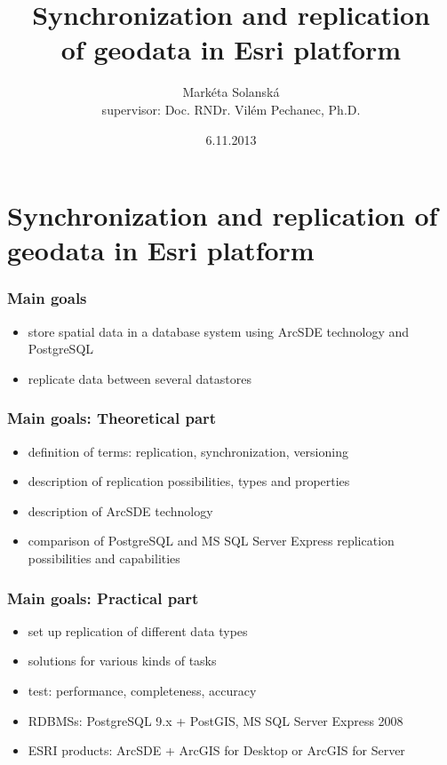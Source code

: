 \documentclass[xcolor=dvipsnames, 14pt]{beamer}
\begin{document}
\title[Synchronization and replication of geodata]{Synchronization and replication \\ of geodata in Esri platform}
\author[M. Solanská]{Markéta Solanská \\ supervisor: Doc. RNDr. Vilém Pechanec, Ph.D.}
\date[6.11.2013]{6.11.2013}





\begin{frame}
  \titlepage
\end{frame}



\section{Synchronization and replication of geodata in Esri platform}

  \begin{frame}
    \frametitle{Main goals}
    \begin{itemize}
      \item store spatial data in a database system using ArcSDE technology and PostgreSQL
      \item replicate data between several datastores
    \end{itemize}
  \end{frame}
  
  \begin{frame}
    \frametitle{Main goals: Theoretical part}
    \begin{itemize}
      \item definition of terms: replication, synchronization, versioning
      \item description of replication possibilities, types and properties
      \item description of ArcSDE technology
      \item comparison of PostgreSQL and MS SQL Server Express replication possibilities and capabilities 
    \end{itemize}
  \end{frame}

  \begin{frame}
    \frametitle{Main goals: Practical part}
    \begin{itemize}
      \item set up replication of different data types
      \item solutions for various kinds of tasks
      \item test: performance, completeness, accuracy 
      \item RDBMSs: PostgreSQL 9.x + PostGIS, MS SQL Server Express 2008
      \item ESRI products: ArcSDE + ArcGIS for Desktop or ArcGIS for Server
    \end{itemize}
  \end{frame}
\end{document}
